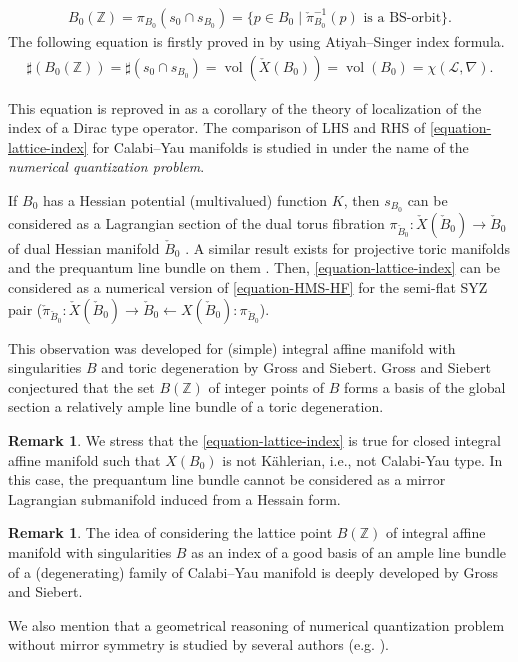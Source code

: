 \documentclass[a4paper,dvipdfmx,reqno,12pt]{amsart}
\theoremstyle{definition}
\newtheorem{remark}[theorem]{Remark}
\newcommand{\Z}{\mathbb{Z}}%
\newcommand{\mcal}[1]{\mathcal{#1}}%
\newcommand{\opn}[1]{\operatorname{#1}}
\numberwithin{equation}{section}
\begin{document}
\begin{align}
B_0(\mathbb{Z})=\pi_{B_0}(s_0\cap s_{B_0})
=\{p\in B_0 \mid  \check{\pi}_{B_0}^{-1}(p) 
\text{ is a BS-orbit}\}.
\end{align}
The following equation is firstly proved in 
\cite[Corollary 4.1]{MR1461965} by using Atiyah--Singer index formula.
\begin{align} \label{equation-lattice-index}
\sharp (B_0(\Z))=\sharp (s_0\cap s_{B_0})
=\opn{vol}(\check{X}(B_0))=\opn{vol}(B_0)
=\chi(\mcal{L},\nabla).
\end{align}

This equation is reproved in \cite{MR2676658} as a 
corollary of the theory of localization of the 
index of a Dirac type operator.
The comparison of LHS and RHS of 
\cref{equation-lattice-index} for
Calabi--Yau manifolds is studied in 
\cite{1999math......2027T} under 
the name of the \emph{numerical quantization problem}.

If $B_0$ has a Hessian potential (multivalued) function $K$, then $s_{B_0}$ can be 
considered as a Lagrangian section of the dual torus 
fibration $\pi_{\check{B}_0}\colon 
\check{X}(\check{B}_0)\to \check{B}_0$ of dual Hessian
manifold $\check{B}_0$ \cite[Proposition 6.9]{MR2567952}.
A similar result exists for projective toric manifolds 
and the prequantum line bundle on them 
\cite[Theorem 3.20]{yamaguchimaster}. 
Then, \cref{equation-lattice-index} can be considered
as a numerical version of \cref{equation-HMS-HF}
for the semi-flat SYZ pair 
($\check{\pi}_{\check{B}_0}\colon \check{X}(\check{B}_0)
\to \check{B}_0 \leftarrow X(\check{B}_0)\colon \pi_{\check{B}_0}$). 

This observation was developed for 
(simple) integral affine manifold with singularities
$B$
and toric degeneration by Gross and Siebert. 
Gross and Siebert conjectured 
that the set $B(\mathbb{Z})$ of integer points of 
$B$ forms a basis of the global section a 
relatively ample line bundle of a toric degeneration.


\begin{remark}
We stress that the \cref{equation-lattice-index} is 
true for closed integral affine manifold 
such that $X(B_0)$ is not K\"ahlerian, i.e., 
not Calabi-Yau type.
In this case,
the prequantum line bundle cannot be considered as
a mirror Lagrangian submanifold induced from a Hessain
form.
\end{remark}



\begin{remark}

The idea of considering the lattice point 
$B(\mathbb{Z})$ of 
integral affine manifold with singularities $B$ as 
an index of a good basis of an ample line bundle of 
a (degenerating) family of Calabi--Yau manifold is 
deeply developed by Gross and Siebert. 




We also mention that a geometrical reasoning 
of numerical quantization problem without
mirror symmetry is studied by several authors 
(e.g. \cite{MR2879247,
https://doi.org/10.48550/arxiv.1904.04076}).
\end{remark}
\end{document}

